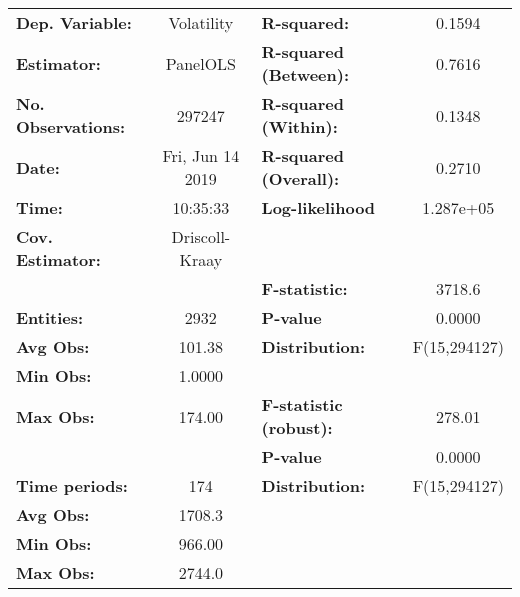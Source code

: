 \begin{center}
\begin{tabular}{lclc}
\toprule
\textbf{Dep. Variable:}                 &     Volatility     & \textbf{  R-squared:         }   &      0.1594      \\
\textbf{Estimator:}                     &      PanelOLS      & \textbf{  R-squared (Between):}  &      0.7616      \\
\textbf{No. Observations:}              &       297247       & \textbf{  R-squared (Within):}   &      0.1348      \\
\textbf{Date:}                          &  Fri, Jun 14 2019  & \textbf{  R-squared (Overall):}  &      0.2710      \\
\textbf{Time:}                          &      10:35:33      & \textbf{  Log-likelihood     }   &    1.287e+05     \\
\textbf{Cov. Estimator:}                &   Driscoll-Kraay   & \textbf{                     }   &                  \\
\textbf{}                               &                    & \textbf{  F-statistic:       }   &      3718.6      \\
\textbf{Entities:}                      &        2932        & \textbf{  P-value            }   &      0.0000      \\
\textbf{Avg Obs:}                       &       101.38       & \textbf{  Distribution:      }   &   F(15,294127)   \\
\textbf{Min Obs:}                       &       1.0000       & \textbf{                     }   &                  \\
\textbf{Max Obs:}                       &       174.00       & \textbf{  F-statistic (robust):} &      278.01      \\
\textbf{}                               &                    & \textbf{  P-value            }   &      0.0000      \\
\textbf{Time periods:}                  &        174         & \textbf{  Distribution:      }   &   F(15,294127)   \\
\textbf{Avg Obs:}                       &       1708.3       & \textbf{                     }   &                  \\
\textbf{Min Obs:}                       &       966.00       & \textbf{                     }   &                  \\
\textbf{Max Obs:}                       &       2744.0       & \textbf{                     }   &                  \\

\end{tabular}
\end{center}
